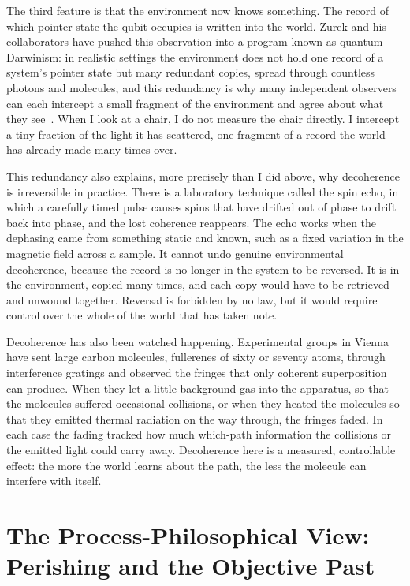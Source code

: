 The third feature is that the environment now knows something.
The record of which pointer state the qubit occupies is written into the world.
Zurek and his collaborators have pushed this observation into a program known as quantum Darwinism: in realistic settings the environment does not hold one record of a system's pointer state but many redundant copies, spread through countless photons and molecules, and this redundancy is why many independent observers can each intercept a small fragment of the environment and agree about what they see~\citep{Zurek2003}.
When I look at a chair, I do not measure the chair directly.
I intercept a tiny fraction of the light it has scattered, one fragment of a record the world has already made many times over.

This redundancy also explains, more precisely than I did above, why decoherence is irreversible in practice.
There is a laboratory technique called the spin echo, in which a carefully timed pulse causes spins that have drifted out of phase to drift back into phase, and the lost coherence reappears.
The echo works when the dephasing came from something static and known, such as a fixed variation in the magnetic field across a sample.
It cannot undo genuine environmental decoherence, because the record is no longer in the system to be reversed.
It is in the environment, copied many times, and each copy would have to be retrieved and unwound together.
Reversal is forbidden by no law, but it would require control over the whole of the world that has taken note.

Decoherence has also been watched happening.
Experimental groups in Vienna have sent large carbon molecules, fullerenes of sixty or seventy atoms, through interference gratings and observed the fringes that only coherent superposition can produce.
When they let a little background gas into the apparatus, so that the molecules suffered occasional collisions, or when they heated the molecules so that they emitted thermal radiation on the way through, the fringes faded.
In each case the fading tracked how much which-path information the collisions or the emitted light could carry away.
Decoherence here is a measured, controllable effect: the more the world learns about the path, the less the molecule can interfere with itself.

\section{The Process-Philosophical View: Perishing and the Objective Past}
\label{sec:ch10-process}

